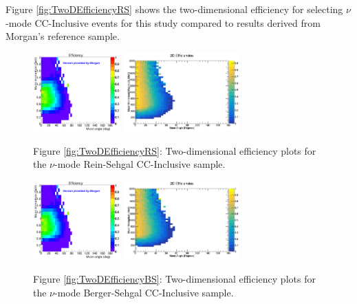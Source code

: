 \documentclass[11pt]{article}
\begin{document}
Figure \ref*{fig:TwoDEfficiencyRS} shows the two-dimensional efficiency for selecting $\nu$-mode CC-Inclusive events for this study compared to results derived from Morgan's reference sample.

\begin{figure}[H]
\centering
\includegraphics[width=0.3\textwidth]{CCInclusivePlots/MorgansCCInclusiveSample.png}
\includegraphics[width=0.4\textwidth]{CCInclusivePlots/2DEffCompareNMRS.png}
\caption*{Figure \ref*{fig:TwoDEfficiencyRS}: Two-dimensional efficiency plots for the $\nu$-mode Rein-Sehgal CC-Inclusive sample.}
\end{figure}\label{fig:TwoDEfficiencyRS}

\begin{figure}[H]
\centering
\includegraphics[width=0.3\textwidth]{CCInclusivePlots/MorgansCCInclusiveSample.png}
\includegraphics[width=0.4\textwidth]{CCInclusivePlots/2DEffCompareNMBS.png}
\caption*{Figure \ref*{fig:TwoDEfficiencyBS}: Two-dimensional efficiency plots for the $\nu$-mode Berger-Sehgal CC-Inclusive sample.}
\end{figure}\label{fig:TwoDEfficiencyBS}
\end{document}
